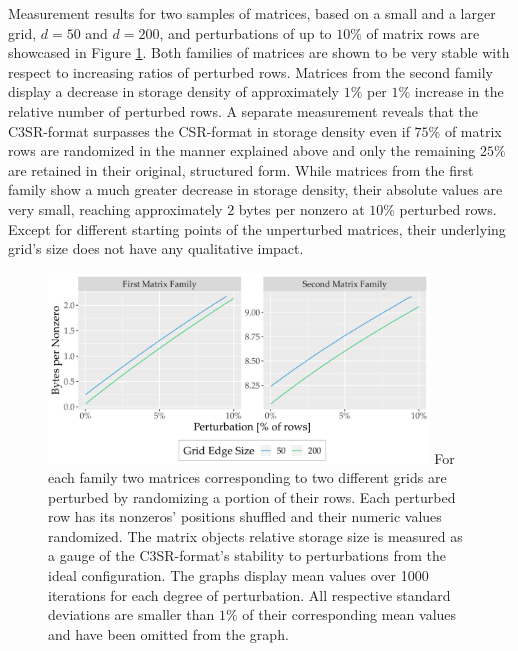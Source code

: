     Measurement results for two samples of matrices, based on a small and a larger grid, $d = 50$ and $d = 200$, and
    perturbations of up to $10\%$ of matrix rows are showcased in Figure \ref{fig:bytespernnz-perturbed}. Both families
    of matrices are shown to be very stable with respect to increasing ratios of perturbed rows. Matrices from the
    second family display a decrease in storage density of approximately $1\%$ per $1\%$ increase in the relative number
    of perturbed rows. A separate measurement reveals that the C3SR-format surpasses the CSR-format in storage density
    even if $75\%$ of matrix rows are randomized in the manner explained above and only the remaining $25\%$ are
    retained in their original, structured form. While matrices from the first family show a much greater decrease in
    storage density, their absolute values are very small, reaching approximately $2$ bytes per nonzero at $10\%$
    perturbed rows. Except for different starting points of the unperturbed matrices, their underlying grid's size does
    not have any qualitative impact.

    \begin{figure}[H]
      \centering
      \captionsetup{width=0.9\textwidth}
      \includegraphics[width=0.9\textwidth]{assets/bytespernnz-perturbed}
       {For each family two matrices corresponding to two different grids are perturbed by
        randomizing a portion of their rows. Each perturbed row has its nonzeros' positions shuffled and their numeric
        values randomized. The matrix objects relative storage size is measured as a gauge of the C3SR-format's
        stability to perturbations from the ideal configuration. The graphs display mean values over 1000 iterations for
        each degree of perturbation. All respective standard deviations are smaller than $1\%$ of their corresponding
        mean values and have been omitted from the graph.}
      \label{fig:bytespernnz-perturbed}
    \end{figure}

